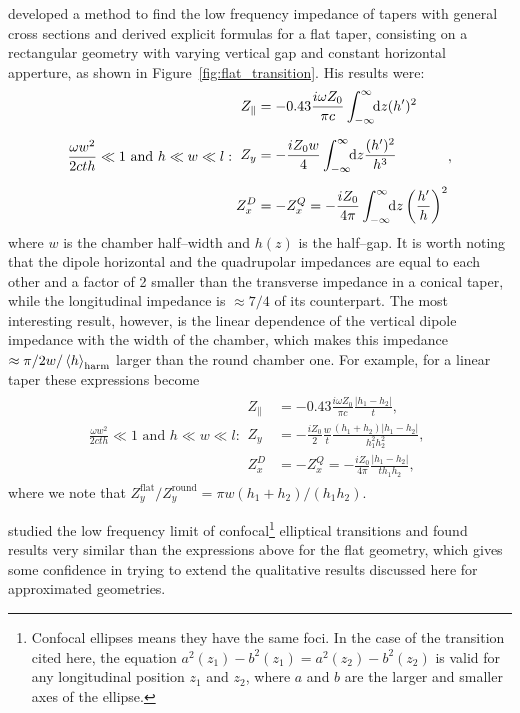      developed a method to find the low frequency impedance of tapers with general cross sections and derived explicit formulas for a flat taper, consisting on a rectangular geometry with varying vertical gap and constant horizontal apperture, as shown in Figure~\ref{fig:flat_transition}. His results were:
    \begin{subequations}\label{eq:flat_transitions}
        \begin{align}
            \frac{\omega w^2}{2cth}\ll1\,\,\text{and}\,\,h\ll w\ll l:
            \begin{aligned}
                Z_\parallel &= -0.43\frac{i \omega Z_0}{\pi c}\infint{z}{(h')^2}\\[2mm]
                Z_y &= -\frac{i Z_0w}{4}\infint{z}{\frac{(h')^2}{h^3}}\\[2mm]
                Z_x^D&= -Z_x^Q= -\frac{i Z_0}{4\pi}\infint{z}{\fof{\frac{h'}{h}}^2}
            \end{aligned},
        \end{align}
    \end{subequations}
    where $w$ is the chamber half--width and $h(z)$ is the half--gap. It is worth noting that the dipole horizontal and the quadrupolar impedances are equal to each other and a factor of 2 smaller than the transverse impedance in a conical taper, while the longitudinal impedance is $\approx7/4$ of its counterpart. The most interesting result, however, is the linear dependence of the vertical dipole impedance with the width of the chamber, which makes this impedance $\approx \pi/2w/\average[\text{harm}]{h}$ larger than the round chamber one. For example, for a linear taper these expressions become
    \begin{align}
        \frac{\omega w^2}{2cth}\ll1\,\,\text{and}\,\,h\ll w\ll l:
        \begin{aligned}
        Z_\parallel &= -0.43\frac{i \omega Z_0}{\pi c}\frac{|h_1-h_2|}{t},\\[2mm]
        Z_y &= -\frac{i Z_0}{2}\frac{w}{t}\frac{(h_1+h_2)|h_1-h_2|}{h_1^2h_2^2},\\[2mm]
        Z_x^D&= -Z_x^Q= -\frac{i Z_0}{4\pi}\frac{|h_1-h_2|}{th_1h_2},
        \end{aligned}
    \end{align}
    where we note that $Z_y^\text{flat}/Z_y^\text{round} = \pi w(h_1+h_2)/(h_1h_2)$.

     studied the low frequency limit of confocal\footnote{Confocal ellipses means they have the same foci. In the case of the transition cited here, the equation $a^2(z_1)-b^2(z_1)=a^2(z_2)-b^2(z_2)$ is valid for any longitudinal position $z_1$ and $z_2$, where $a$ and $b$ are the larger and smaller axes of the ellipse.} elliptical transitions and found results very similar than the expressions above for the flat geometry, which gives some confidence in trying to extend the qualitative results discussed here for approximated geometries.

